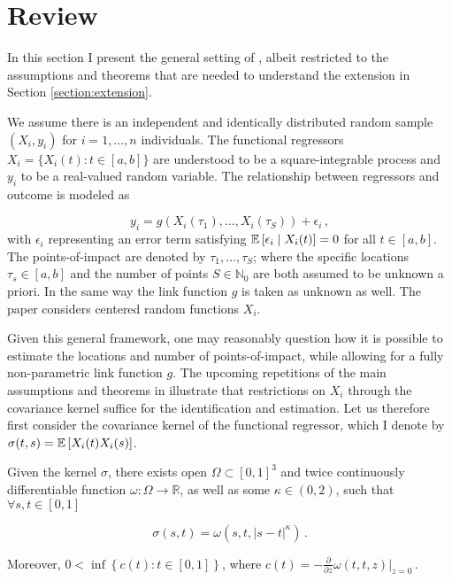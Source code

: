 \section{Review}
\label{section:review}

In this section I present the general setting of \cite{Kneip2020}, albeit restricted to
the assumptions and theorems that are needed to understand the extension in Section
\ref{section:extension}.

We assume there is an independent and identically distributed random sample $(X_i, y_i)$
for $i=1,\dots,n$ individuals. The functional regressors $X_i = \{ X_i(t) : t \in [a, b]
\}$ are understood to be a square-integrable process and $y_i$ to be a real-valued
random variable. The relationship between regressors and outcome is modeled as

\[
    y_i = g \left( X_i(\tau_1), \dots, X_i(\tau_S) \right) + \epsilon_i \,,
\]
with $\epsilon_i$ representing an error term satisfying $\mathbb{E}\left[\epsilon_i \mid
X_i(t)\right] = 0$ for all $t \in [a, b]$. The points-of-impact are denoted by $\tau_1, \dots,
\tau_S$; where the specific locations $\tau_s \in [a, b]$ and the number of points $S
\in \mathbb{N}_0$ are both assumed to be unknown a priori. In the same way the link
function $g$ is taken as unknown as well. The paper considers centered random functions
$X_i$.

Given this general framework, one may reasonably question how it is possible to estimate
the locations and number of points-of-impact, while allowing for a fully non-parametric
link function $g$. The upcoming repetitions of the main assumptions and theorems in
\cite{Kneip2020} illustrate that restrictions on $X_i$ through the covariance kernel
suffice for the identification and estimation. Let us therefore first consider the
covariance kernel of the functional regressor, which I denote by $\sigma(t, s) =
\mathbb{E}\left[X_i(t) X_i(s)\right]$.


\begin{assumption}
    Given the kernel $\sigma$, there exists open $\Omega \subset [0, 1]^3$ and twice
    continuously differentiable function $\omega : \Omega \to \mathbb{R}$, as well as
    some $\kappa \in (0, 2)$, such that $\forall s, t \in [0, 1]$

    \[
        \sigma(s, t) = \omega(s, t, |s-t|^{\kappa}) \,.
    \]

    Moreover, $0 < \inf \left\{ c(t) : t \in [0, 1] \right\}$, where $c(t) =
    -\frac{\partial}{\partial z} \omega(t, t, z)|_{z = 0} \,.$
\label{assumption:1}
\end{assumption}

